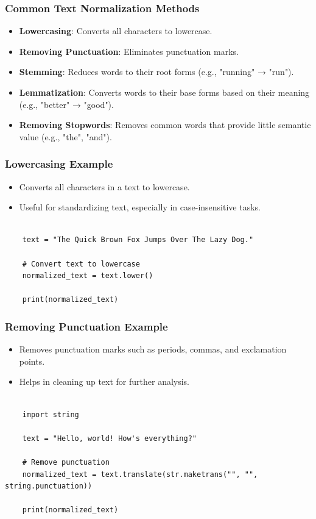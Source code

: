 \documentclass{beamer}
\begin{document}
\begin{frame}
    \frametitle{Common Text Normalization Methods}
    \begin{itemize}
        \item \textbf{Lowercasing}: Converts all characters to lowercase.
        \item \textbf{Removing Punctuation}: Eliminates punctuation marks.
        \item \textbf{Stemming}: Reduces words to their root forms (e.g., "running" → "run").
        \item \textbf{Lemmatization}: Converts words to their base forms based on their meaning (e.g., "better" → "good").
        \item \textbf{Removing Stopwords}: Removes common words that provide little semantic value (e.g., "the", "and").
    \end{itemize}
\end{frame}

\begin{frame}[fragile]
    \frametitle{Lowercasing Example}
    \begin{itemize}
        \item Converts all characters in a text to lowercase.
        \item Useful for standardizing text, especially in case-insensitive tasks.
    \end{itemize}
    \begin{lstlisting}[style=pythonStyle, caption=Lowercasing in Python]

    text = "The Quick Brown Fox Jumps Over The Lazy Dog."

    # Convert text to lowercase
    normalized_text = text.lower()

    print(normalized_text)
    \end{lstlisting}
\end{frame}

\begin{frame}[fragile]
    \frametitle{Removing Punctuation Example}
    \begin{itemize}
        \item Removes punctuation marks such as periods, commas, and exclamation points.
        \item Helps in cleaning up text for further analysis.
    \end{itemize}
    \begin{lstlisting}[style=pythonStyle, caption=Removing Punctuation in Python]

    import string

    text = "Hello, world! How's everything?"

    # Remove punctuation
    normalized_text = text.translate(str.maketrans("", "", string.punctuation))

    print(normalized_text)
    \end{lstlisting}
\end{frame}
\end{document}
